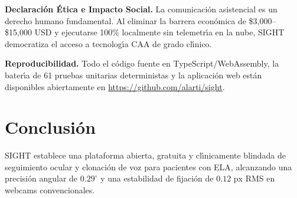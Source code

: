\documentclass[twocolumn,10pt]{article}
\begin{document}
\textbf{Declaraci\'on \'Etica e Impacto Social.} La comunicaci\'on asistencial es un derecho humano fundamental. Al eliminar la barrera econ\'omica de \$3,000--\$15,000 USD y ejecutarse 100\% localmente sin telemetr\'{\i}a en la nube, SIGHT democratiza el acceso a tecnolog\'{\i}a CAA de grado cl\'{\i}nico.

\textbf{Reproducibilidad.} Todo el c\'odigo fuente en TypeScript/WebAssembly, la bater\'{\i}a de 61 pruebas unitarias deterministas y la aplicaci\'on web est\'an disponibles abiertamente en \url{https://github.com/alarti/sight}.

\section{Conclusi\'on}
SIGHT establece una plataforma abierta, gratuita y cl\'{\i}nicamente blindada de seguimiento ocular y clonaci\'on de voz para pacientes con ELA, alcanzando una precisi\'on angular de $0.29^\circ$ y una estabilidad de fijaci\'on de $0.12\text{ px}$ RMS en webcams convencionales.
\end{document}

